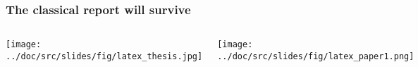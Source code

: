 \documentclass{beamer}
\begin{document}
\begin{frame}
\frametitle{The classical report will survive}

\begin{columns}
\vspace{6mm}
\centerline{\texttt{[image: ../doc/src/slides/fig/latex\_thesis.jpg]}}
\vspace{6mm}

\vspace{6mm}
\centerline{\texttt{[image: ../doc/src/slides/fig/latex\_paper1.png]}}
\vspace{6mm}

\end{columns}
\end{frame}
\end{document}
